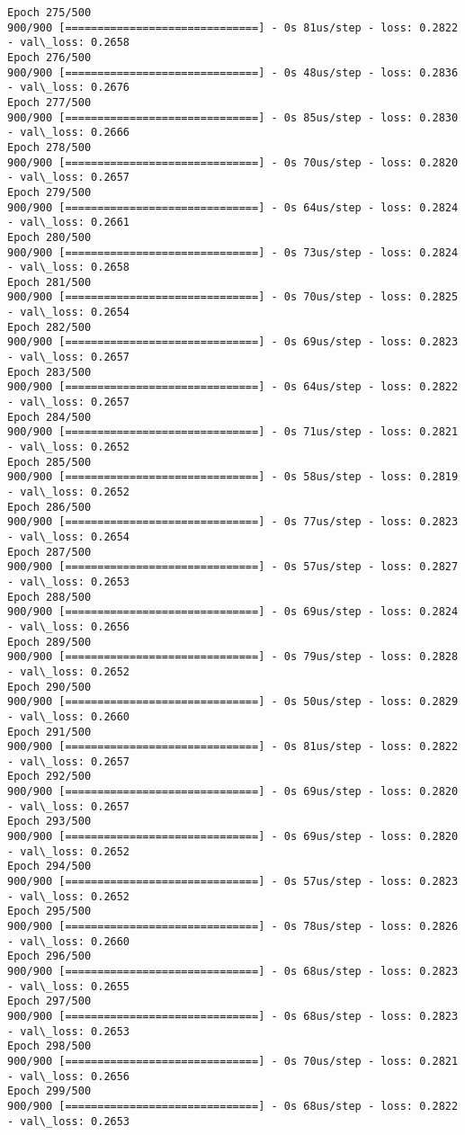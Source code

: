 \documentclass[11pt]{article}
\begin{document}
\begin{Verbatim}[commandchars=\\\{\}]
Epoch 275/500
900/900 [==============================] - 0s 81us/step - loss: 0.2822 - val\_loss: 0.2658
Epoch 276/500
900/900 [==============================] - 0s 48us/step - loss: 0.2836 - val\_loss: 0.2676
Epoch 277/500
900/900 [==============================] - 0s 85us/step - loss: 0.2830 - val\_loss: 0.2666
Epoch 278/500
900/900 [==============================] - 0s 70us/step - loss: 0.2820 - val\_loss: 0.2657
Epoch 279/500
900/900 [==============================] - 0s 64us/step - loss: 0.2824 - val\_loss: 0.2661
Epoch 280/500
900/900 [==============================] - 0s 73us/step - loss: 0.2824 - val\_loss: 0.2658
Epoch 281/500
900/900 [==============================] - 0s 70us/step - loss: 0.2825 - val\_loss: 0.2654
Epoch 282/500
900/900 [==============================] - 0s 69us/step - loss: 0.2823 - val\_loss: 0.2657
Epoch 283/500
900/900 [==============================] - 0s 64us/step - loss: 0.2822 - val\_loss: 0.2657
Epoch 284/500
900/900 [==============================] - 0s 71us/step - loss: 0.2821 - val\_loss: 0.2652
Epoch 285/500
900/900 [==============================] - 0s 58us/step - loss: 0.2819 - val\_loss: 0.2652
Epoch 286/500
900/900 [==============================] - 0s 77us/step - loss: 0.2823 - val\_loss: 0.2654
Epoch 287/500
900/900 [==============================] - 0s 57us/step - loss: 0.2827 - val\_loss: 0.2653
Epoch 288/500
900/900 [==============================] - 0s 69us/step - loss: 0.2824 - val\_loss: 0.2656
Epoch 289/500
900/900 [==============================] - 0s 79us/step - loss: 0.2828 - val\_loss: 0.2652
Epoch 290/500
900/900 [==============================] - 0s 50us/step - loss: 0.2829 - val\_loss: 0.2660
Epoch 291/500
900/900 [==============================] - 0s 81us/step - loss: 0.2822 - val\_loss: 0.2657
Epoch 292/500
900/900 [==============================] - 0s 69us/step - loss: 0.2820 - val\_loss: 0.2657
Epoch 293/500
900/900 [==============================] - 0s 69us/step - loss: 0.2820 - val\_loss: 0.2652
Epoch 294/500
900/900 [==============================] - 0s 57us/step - loss: 0.2823 - val\_loss: 0.2652
Epoch 295/500
900/900 [==============================] - 0s 78us/step - loss: 0.2826 - val\_loss: 0.2660
Epoch 296/500
900/900 [==============================] - 0s 68us/step - loss: 0.2823 - val\_loss: 0.2655
Epoch 297/500
900/900 [==============================] - 0s 68us/step - loss: 0.2823 - val\_loss: 0.2653
Epoch 298/500
900/900 [==============================] - 0s 70us/step - loss: 0.2821 - val\_loss: 0.2656
Epoch 299/500
900/900 [==============================] - 0s 68us/step - loss: 0.2822 - val\_loss: 0.2653

\end{Verbatim}
\end{document}
